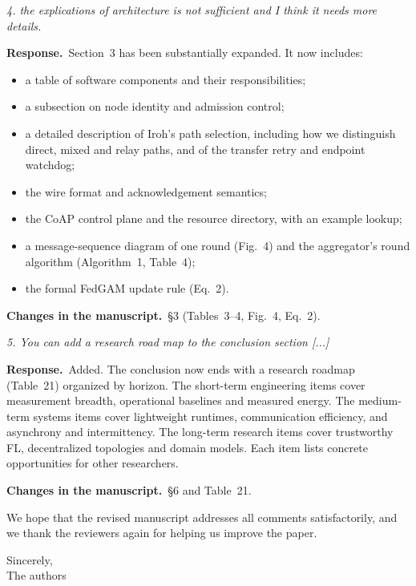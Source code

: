 \documentclass[11pt,a4paper]{article}
\newenvironment{comment}{\par\medskip\noindent\begin{minipage}{\linewidth}\color{blue!45!black}\itshape}{\end{minipage}\par}
\newcommand{\reply}{\par\smallskip\noindent\textbf{Response.}~}
\newcommand{\changes}{\par\smallskip\noindent\textbf{Changes in the manuscript.}~}
\begin{document}
\begin{comment}
4. the explications of architecture is not sufficient and I think it needs more details.
\end{comment}
\reply Section~3 has been substantially expanded. It now includes:
\begin{itemize}[leftmargin=1.3em,itemsep=0.1em]
\item a table of software components and their responsibilities;
\item a subsection on node identity and admission control;
\item a detailed description of Iroh's path selection, including how we distinguish direct, mixed and relay paths, and of the transfer retry and endpoint watchdog;
\item the wire format and acknowledgement semantics;
\item the CoAP control plane and the resource directory, with an example lookup;
\item a message-sequence diagram of one round (Fig.~4) and the aggregator's round algorithm (Algorithm~1, Table~4);
\item the formal FedGAM update rule (Eq.~2).
\end{itemize}

\changes \S3 (Tables~3--4, Fig.~4, Eq.~2).

\begin{comment}
5. You can add a research road map to the conclusion section [...]
\end{comment}
\reply Added. The conclusion now ends with a research roadmap (Table~21) organized by horizon. The short-term engineering items cover measurement breadth, operational baselines and measured energy. The medium-term systems items cover lightweight runtimes, communication efficiency, and asynchrony and intermittency. The long-term research items cover trustworthy FL, decentralized topologies and domain models. Each item lists concrete opportunities for other researchers.

\changes \S6 and Table~21.

\bigskip
We hope that the revised manuscript addresses all comments satisfactorily, and we thank the reviewers again for helping us improve the paper.

Sincerely,\\
The authors
\end{document}
